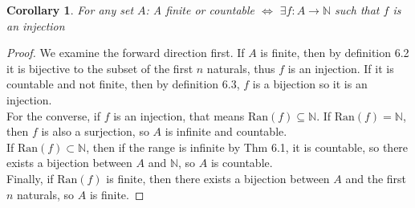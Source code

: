 \documentclass{article}
\newtheorem{cor}{Corollary}[section]
\begin{document}
\medskip
\begin{cor}
For any set $A$: A finite or countable $\iff$ $\exists f: A \xrightarrow{} \mathbb{N}$ such that $f$ is an injection
\end{cor}
\begin{proof}
We examine the forward direction first. If $A$ is finite, then by definition 6.2 it is bijective to the subset of the first $n$ naturals, thus $f$ is an injection. If it is countable and not finite, then by definition 6.3, $f$ is a bijection so it is an injection.\\

For the converse, if $f$ is an injection, that means $\text{Ran}(f) \subseteq \mathbb{N}$. If $\text{Ran}(f) = \mathbb{N}$, then $f$ is also a surjection, so $A$ is infinite and countable.\\

If $\text{Ran}(f) \subset \mathbb{N}$, then if the range is infinite by Thm 6.1, it is countable, so there exists a bijection between $A$ and $\mathbb{N}$, so $A$ is countable.\\

Finally, if $\text{Ran}(f)$ is finite, then there exists a bijection between $A$ and the first $n$ naturals, so $A$ is finite.
\end{proof}
\end{document}
